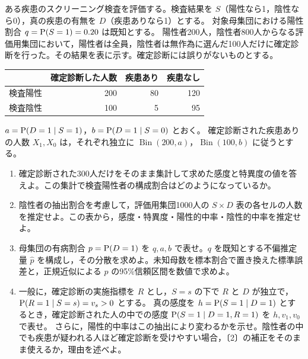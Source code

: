 \documentclass[a4paper,11pt]{ltjsarticle}
\begin{document}
ある疾患のスクリーニング検査を評価する。検査結果を $S$（陽性なら1，陰性なら0），真の疾患の有無を $D$（疾患ありなら1）とする。
対象母集団における陽性割合 $q=\operatorname{P}(S=1)=0.20$ は既知とする。
陽性者200人，陰性者800人からなる評価用集団において，陽性者は全員，陰性者は無作為に選んだ100人だけに確定診断を行った。その結果を表に示す。確定診断には誤りがないものとする。
\begin{center}
\begin{tabular}{lrrr}
\toprule
 & 確定診断した人数 & 疾患あり & 疾患なし\\
\midrule
検査陽性 & 200 & 80 & 120\\
検査陰性 & 100 & 5 & 95\\
\bottomrule
\end{tabular}
\end{center}
$a=\operatorname{P}(D=1\mid S=1)$，$b=\operatorname{P}(D=1\mid S=0)$ とおく。
確定診断された疾患ありの人数 $X_1,X_0$ は，それぞれ独立に
$\operatorname{Bin}(200,a)$，$\operatorname{Bin}(100,b)$ に従うとする。
\begin{enumerate}
\item 確定診断された300人だけをそのまま集計して求めた感度と特異度の値を答えよ。この集計で検査陽性者の構成割合はどのようになっているか。
\item 陰性者の抽出割合を考慮して，評価用集団1000人の $S\times D$ 表の各セルの人数を推定せよ。この表から，感度・特異度・陽性的中率・陰性的中率を推定せよ。
\item 母集団の有病割合 $p=\operatorname{P}(D=1)$ を $q,a,b$ で表せ。$q$ を既知とする不偏推定量 $\hat p$ を構成し，その分散を求めよ。未知母数を標本割合で置き換えた標準誤差と，正規近似による $p$ の95\%信頼区間を数値で求めよ。
\item 一般に，確定診断の実施指標を $R$ とし，$S=s$ の下で $R$ と $D$ が独立で，$\operatorname{P}(R=1\mid S=s)=v_s>0$ とする。
真の感度を $h=\operatorname{P}(S=1\mid D=1)$ とするとき，確定診断された人の中での感度 $\operatorname{P}(S=1\mid D=1,R=1)$ を $h,v_1,v_0$ で表せ。
さらに，陽性的中率はこの抽出により変わるかを示せ。陰性者の中でも疾患が疑われる人ほど確定診断を受けやすい場合，〔2〕の補正をそのまま使えるか，理由を述べよ。
\end{enumerate}
\newpage
\end{document}
